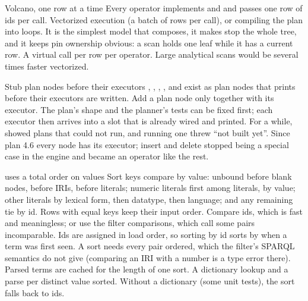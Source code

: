 \begin{decision}{Volcano, one row at a time}
 Every operator implements  and  and passes
one row of ids per call.
 Vectorized execution (a batch of rows per call), or
compiling the plan into loops.
 It is the simplest model that composes, it makes  stop
the whole tree, and it keeps pin ownership obvious: a scan holds one leaf while
it has a current row.
 A virtual call per row per operator. Large analytical scans would
be several times faster vectorized.
\end{decision}

\begin{decision}{Stub plan nodes before their executors}
 , , , , and
 exist as plan nodes that  prints
before their executors are written.
 Add a plan node only together with its executor.
 The plan's shape and the planner's tests can be fixed first; each
executor then arrives into a slot that is already wired and printed.
 For a while,  showed plans that could
not run, and running one threw ``not built yet''. Since plan 4.6 every node
has its executor; insert and delete stopped being a special case in the
engine and became an operator like the rest.
\end{decision}

\begin{decision}{ uses a total order on values}
 Sort keys compare by value: unbound before blank nodes, before
IRIs, before literals; numeric literals first among literals, by value; other
literals by lexical form, then datatype, then language; and any remaining tie
by id. Rows with equal keys keep their input order.
 Compare ids, which is fast and meaningless; or use the
filter comparisons, which call some pairs incomparable.
 Ids are assigned in load order, so sorting by id sorts by when a
term was first seen. A sort needs every pair ordered, which the filter's
SPARQL semantics do not give (comparing an IRI with a number is a type error
there). Parsed terms are cached for the length of one sort.
 A dictionary lookup and a parse per distinct value sorted. Without
a dictionary (some unit tests), the sort falls back to ids.
\end{decision}

